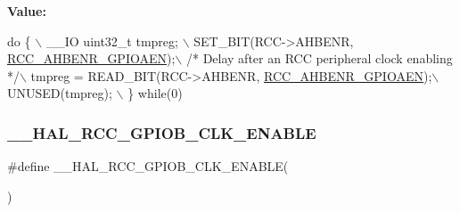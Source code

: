 {\bfseries Value\+:}
\begin{DoxyCode}
\textcolor{keywordflow}{do} \{ \(\backslash\)
                                        \_\_IO uint32\_t tmpreg; \(\backslash\)
                                        SET\_BIT(RCC->AHBENR, \hyperlink{group___peripheral___registers___bits___definition_ga8909660b884f126ab1476daac7999619}{RCC\_AHBENR\_GPIOAEN});\(\backslash\)
                                        \textcolor{comment}{/* Delay after an RCC peripheral clock enabling */}\(\backslash\)
                                        tmpreg = READ\_BIT(RCC->AHBENR, 
      \hyperlink{group___peripheral___registers___bits___definition_ga8909660b884f126ab1476daac7999619}{RCC\_AHBENR\_GPIOAEN});\(\backslash\)
                                        UNUSED(tmpreg); \(\backslash\)
                                      \} \textcolor{keywordflow}{while}(0)
\end{DoxyCode}
\mbox{\label{group___r_c_c___a_h_b___clock___enable___disable_ga5ad43f3f4d8163d40f7d402ef75d27c5}} 
\subsubsection{\texorpdfstring{\+\_\+\+\_\+\+H\+A\+L\+\_\+\+R\+C\+C\+\_\+\+G\+P\+I\+O\+B\+\_\+\+C\+L\+K\+\_\+\+E\+N\+A\+B\+LE}{\_\_HAL\_RCC\_GPIOB\_CLK\_ENABLE}}
{\footnotesize\ttfamily \#define \+\_\+\+\_\+\+H\+A\+L\+\_\+\+R\+C\+C\+\_\+\+G\+P\+I\+O\+B\+\_\+\+C\+L\+K\+\_\+\+E\+N\+A\+B\+LE(\begin{DoxyParamCaption}{ }\end{DoxyParamCaption})}

